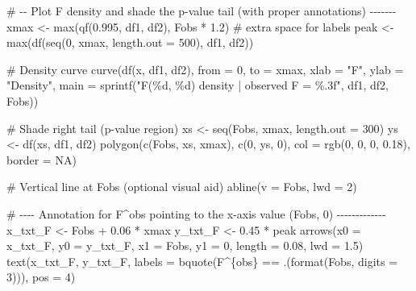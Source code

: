 \documentclass[
  letterpaper,
  DIV=11,
  numbers=noendperiod]{scrreprt}
\newenvironment{Shaded}{\begin{snugshade}}{\end{snugshade}}
\newcommand{\AttributeTok}[1]{\textcolor[rgb]{0.40,0.45,0.13}{#1}}
\newcommand{\CommentTok}[1]{\textcolor[rgb]{0.37,0.37,0.37}{#1}}
\newcommand{\ConstantTok}[1]{\textcolor[rgb]{0.56,0.35,0.01}{#1}}
\newcommand{\DecValTok}[1]{\textcolor[rgb]{0.68,0.00,0.00}{#1}}
\newcommand{\FloatTok}[1]{\textcolor[rgb]{0.68,0.00,0.00}{#1}}
\newcommand{\FunctionTok}[1]{\textcolor[rgb]{0.28,0.35,0.67}{#1}}
\newcommand{\NormalTok}[1]{\textcolor[rgb]{0.00,0.23,0.31}{#1}}
\newcommand{\OtherTok}[1]{\textcolor[rgb]{0.00,0.23,0.31}{#1}}
\newcommand{\SpecialCharTok}[1]{\textcolor[rgb]{0.37,0.37,0.37}{#1}}
\newcommand{\StringTok}[1]{\textcolor[rgb]{0.13,0.47,0.30}{#1}}
\begin{document}
\begin{Shaded}
\begin{Highlighting}[]
\CommentTok{\# {-}{-} Plot F density and shade the p{-}value tail (with proper annotations) {-}{-}{-}{-}{-}{-}{-}}
\NormalTok{xmax }\OtherTok{\textless{}{-}} \FunctionTok{max}\NormalTok{(}\FunctionTok{qf}\NormalTok{(}\FloatTok{0.995}\NormalTok{, df1, df2), Fobs }\SpecialCharTok{*} \FloatTok{1.2}\NormalTok{)  }\CommentTok{\# extra space for labels}
\NormalTok{peak }\OtherTok{\textless{}{-}} \FunctionTok{max}\NormalTok{(}\FunctionTok{df}\NormalTok{(}\FunctionTok{seq}\NormalTok{(}\DecValTok{0}\NormalTok{, xmax, }\AttributeTok{length.out =} \DecValTok{500}\NormalTok{), df1, df2))}

\CommentTok{\# Density curve}
\FunctionTok{curve}\NormalTok{(}\FunctionTok{df}\NormalTok{(x, df1, df2), }\AttributeTok{from =} \DecValTok{0}\NormalTok{, }\AttributeTok{to =}\NormalTok{ xmax,}
      \AttributeTok{xlab =} \StringTok{"F"}\NormalTok{, }\AttributeTok{ylab =} \StringTok{"Density"}\NormalTok{,}
      \AttributeTok{main =} \FunctionTok{sprintf}\NormalTok{(}\StringTok{"F(\%d, \%d) density  |  observed F = \%.3f"}\NormalTok{, df1, df2, Fobs))}

\CommentTok{\# Shade right tail (p{-}value region)}
\NormalTok{xs }\OtherTok{\textless{}{-}} \FunctionTok{seq}\NormalTok{(Fobs, xmax, }\AttributeTok{length.out =} \DecValTok{300}\NormalTok{)}
\NormalTok{ys }\OtherTok{\textless{}{-}} \FunctionTok{df}\NormalTok{(xs, df1, df2)}
\FunctionTok{polygon}\NormalTok{(}\FunctionTok{c}\NormalTok{(Fobs, xs, xmax), }\FunctionTok{c}\NormalTok{(}\DecValTok{0}\NormalTok{, ys, }\DecValTok{0}\NormalTok{),}
        \AttributeTok{col =} \FunctionTok{rgb}\NormalTok{(}\DecValTok{0}\NormalTok{, }\DecValTok{0}\NormalTok{, }\DecValTok{0}\NormalTok{, }\FloatTok{0.18}\NormalTok{), }\AttributeTok{border =} \ConstantTok{NA}\NormalTok{)}

\CommentTok{\# Vertical line at Fobs (optional visual aid)}
\FunctionTok{abline}\NormalTok{(}\AttributeTok{v =}\NormalTok{ Fobs, }\AttributeTok{lwd =} \DecValTok{2}\NormalTok{)}

\CommentTok{\# {-}{-}{-}{-} Annotation for F\^{}obs pointing to the x{-}axis value (Fobs, 0) {-}{-}{-}{-}{-}{-}{-}{-}{-}{-}{-}{-}{-}}
\NormalTok{x\_txt\_F }\OtherTok{\textless{}{-}}\NormalTok{ Fobs }\SpecialCharTok{+} \FloatTok{0.06} \SpecialCharTok{*}\NormalTok{ xmax}
\NormalTok{y\_txt\_F }\OtherTok{\textless{}{-}} \FloatTok{0.45} \SpecialCharTok{*}\NormalTok{ peak}
\FunctionTok{arrows}\NormalTok{(}\AttributeTok{x0 =}\NormalTok{ x\_txt\_F, }\AttributeTok{y0 =}\NormalTok{ y\_txt\_F, }\AttributeTok{x1 =}\NormalTok{ Fobs, }\AttributeTok{y1 =} \DecValTok{0}\NormalTok{,}
       \AttributeTok{length =} \FloatTok{0.08}\NormalTok{, }\AttributeTok{lwd =} \FloatTok{1.5}\NormalTok{)}
\FunctionTok{text}\NormalTok{(x\_txt\_F, y\_txt\_F,}
     \AttributeTok{labels =} \FunctionTok{bquote}\NormalTok{(F}\SpecialCharTok{\^{}}\NormalTok{\{obs\} }\SpecialCharTok{==}\NormalTok{ .(}\FunctionTok{format}\NormalTok{(Fobs, }\AttributeTok{digits =} \DecValTok{3}\NormalTok{))),}
     \AttributeTok{pos =} \DecValTok{4}\NormalTok{)}


\end{Highlighting}
\end{Shaded}
\end{document}
